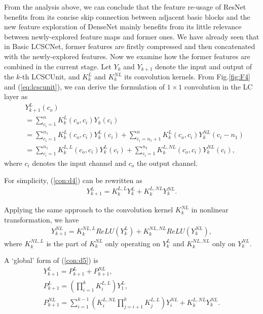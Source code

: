 \documentclass[journal]{IEEEtran}
\begin{document}
From the analysis above, we can conclude that the feature re-usage of ResNet benefits from its concise skip connection between adjacent basic blocks and the new feature exploration of DenseNet mainly benefits from its little relevance between newly-explored feature maps and former ones. We have already seen that in Basic LCSCNet, former features are firstly compressed and then concatenated with the newly-explored features. Now we examine how the former features are combined in the current stage. Let $Y_{k}$ and $Y_{k+1}$ denote the input and output of the $k$-th LCSCUnit, and $K_{k}^{L}$ and $K_{k}^{NL}$ its convolution kernels. From Fig.\ref{fig:F4} and (\ref{eq:lcscunit}), we can derive the formulation of $1 \times 1$ convolution in the LC layer as   
\begin{align}
&Y_{k+1}^{L}(c_{o})
\nonumber \\                        
                   &=\sum_{c_{i}=1}^{n}K_{k}^{L}(c_{o},c_{i})Y_{k}(c_{i})  \nonumber \\
                   &=\sum_{c_{i}=1}^{n_{1}}K_{k}^{L}(c_{o},c_{i})Y_{k}^{L}(c_{i})+  
                   \sum_{c_{i}=n_{1}+1}^{n}K_{k}^{L}(c_{o},c_{i})Y_{k}^{NL}(c_{i}-n_{1})  \nonumber \\
                   &=\sum_{c_{i}=1}^{n_{1}}K_{k}^{L,L}(c_{o},c_{i})Y_{k}^{L}(c_{i})+
                   \sum_{c_{i}=1}^{n_{2}}K_{k}^{L,NL}(c_{o},c_{i})Y_{k}^{NL}(c_{i}), 
\label{con:d4}
\end{align}
where $c_{i}$ denotes the input channel and $c_{o}$ the output channel.

For simplicity, (\ref{con:d4}) can be rewritten as
\begin{equation}
\begin{split}
Y_{k+1}^{L}=K_{k}^{L,L}Y_{k}^{L}+K_{k}^{L,NL}Y_{k}^{NL}.
\end{split}
\label{con:d5}
\end{equation}    

Applying the same approach to the convolution kernel $K_{k}^{NL}$ in nonlinear transformation, we have
\begin{equation}
\begin{split}
Y_{k+1}^{NL}=K_{k}^{NL,L}ReLU(Y_{k}^{L})+K_{k}^{NL,NL}ReLU(Y_{k}^{NL}),
\end{split}
\label{con:d6}
\end{equation}
where $K_{k}^{NL,L}$ is the part of $K_{k}^{NL}$ only operating on $Y_{k}^{L}$ and $K_{k}^{NL,NL}$ only on $Y_{k}^{NL}$.

A `global' form of (\ref{con:d5}) is 
\begin{gather}
Y_{k+1}^{L}=P_{k+1}^{L}+P_{k+1}^{NL},\\
P_{k+1}^{L}=(\prod_{i=1}^{k}K_{i}^{L,L})Y_{1}^{L},\\ 
P_{k+1}^{NL}=\sum_{i=1}^{k-1}(K_{i}^{L,NL}\prod_{j=i+1}^{k}K_{j}^{L,L})Y_{i}^{NL}+K_{k}^{L,NL}Y_{k}^{NL}.
\label{con:d7}
\end{gather}
\end{document}
